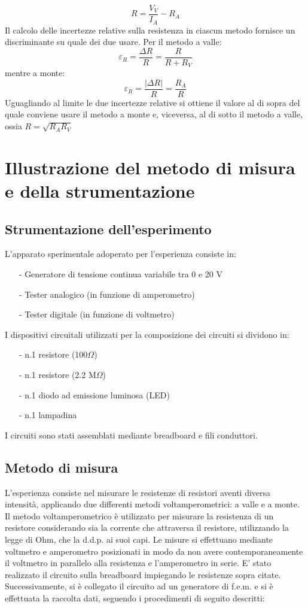 \documentclass{article}
\begin{document}
\begin{equation}
    R = \frac{V_V}{I_A}-R_A
\end{equation}
Il calcolo delle incertezze relative sulla resistenza in ciascun metodo fornisce un
discriminante su quale dei due usare. Per il metodo a valle:
\begin{equation}
    \varepsilon_R = \frac{\Delta R}{R} = \frac{R}{R + R_V}
\end{equation}
mentre a monte:
\begin{equation}
    \varepsilon_R = \frac{|\Delta R|}{R} = \frac{R_A}{R}
\end{equation}
Uguagliando al limite le due incertezze relative si ottiene il valore al di sopra
del quale conviene usare il metodo a monte e, viceversa, al di sotto il metodo a
valle, ossia $R = \sqrt{R_A R_V}$

\section{Illustrazione del metodo di misura e della strumentazione}
\subsection{Strumentazione dell'esperimento}
L'apparato sperimentale adoperato per l'esperienza consiste in:
\begin{itemize}
    \item[-] Generatore di tensione continua variabile tra 0 e 20 V
    \item[-] Tester analogico (in funzione di amperometro)
    \item[-] Tester digitale (in funzione di voltmetro)
\end{itemize}
I dispositivi circuitali utilizzati per la composizione dei circuiti si dividono
in:
\begin{itemize}
    \item[-] n.1 resistore (100$\Omega$)
    \item[-] n.1 resistore (2.2 M$\Omega$)
    \item[-] n.1 diodo ad emissione luminosa (LED)
    \item[-] n.1 lampadina
\end{itemize}
I circuiti sono stati assemblati mediante breadboard e fili conduttori.

\subsection{Metodo di misura}
L’esperienza consiste nel misurare le resistenze di resistori aventi diversa
intensità, applicando due differenti metodi voltamperometrici: a valle e a monte. Il metodo
voltamperometrico è utilizzato per misurare la resistenza di un resistore
considerando sia la corrente che attraversa il resistore, utilizzando la legge di
Ohm, che la d.d.p. ai suoi capi. Le misure si effettuano mediante voltmetro
e amperometro posizionati in modo da non avere contemporaneamente il voltmetro
in parallelo alla resistenza e l’amperometro in serie. E' stato realizzato il
circuito sulla breadboard impiegando le resistenze sopra citate. Successivamente,
si è collegato il circuito ad un generatore di f.e.m. e si è effettuata la raccolta
dati, seguendo i procedimenti di seguito descritti:
\end{document}
